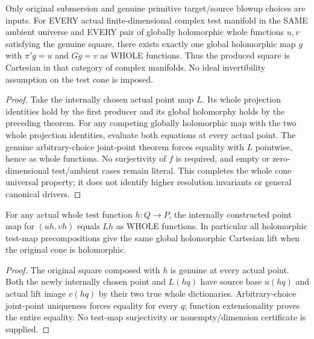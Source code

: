 \begin{theorem}
\label{hir:submersion-blowup-cartesian-whole-universal}
\leanok
{}
Only original submersion and genuine primitive target/source blowup choices
are inputs. For EVERY actual finite-dimensional complex test manifold in
the SAME ambient universe and EVERY pair of globally holomorphic whole
functions $u,v$ satisfying the genuine square, there exists exactly one
global holomorphic map $g$ with $\pi'g=u$ and $Gg=v$ as WHOLE functions.
Thus the produced square is Cartesian in that category of complex
manifolds. No ideal invertibility assumption on the test cone is imposed.
\end{theorem}
\begin{proof}
Take the internally chosen actual point map $L$. Its whole projection
identities hold by the first producer and its global holomorphy holds by
the preceding theorem. For any competing globally holomorphic map with
the two whole projection identities, evaluate both equations at every
actual point. The genuine arbitrary-choice joint-point theorem forces
equality with $L$ pointwise, hence as whole functions. No surjectivity of
$f$ is required, and empty or zero-dimensional test/ambient cases remain
literal. This completes the whole cone universal property; it does not
identify higher resolution invariants or general canonical drivers.
\end{proof}

\begin{theorem}
\label{hir:submersion-blowup-cartesian-cone-composition}
\leanok
{}
For any actual whole test function $h:Q\to P$, the internally constructed
point map for $(uh,vh)$ equals $Lh$ as WHOLE functions. In particular all
holomorphic test-map precompositions give the same global holomorphic
Cartesian lift when the original cone is holomorphic.
\end{theorem}
\begin{proof}
The original square composed with $h$ is genuine at every actual point.
Both the newly internally chosen point and $L(hq)$ have source base $u(hq)$
and actual lift image $v(hq)$ by their two true whole dictionaries.
Arbitrary-choice joint-point uniqueness forces equality for every $q$;
function extensionality proves the entire equality. No test-map
surjectivity or nonempty/dimension certificate is supplied.
\end{proof}

